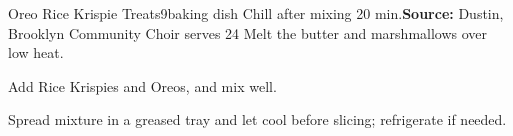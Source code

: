 \begin{recipe}{Oreo Rice Krispie Treats}{9\inch{}\inch baking dish \hfill Chill after mixing \hfill 20 min.}{\textbf{Source:}  Dustin, Brooklyn Community Choir \hfill serves 24}
 Melt the butter and marshmallows over low heat.

 Add Rice Krispies and Oreos, and mix well.

 \newstep Spread mixture in a greased tray and let cool before slicing; refrigerate if needed.
\end{recipe}
